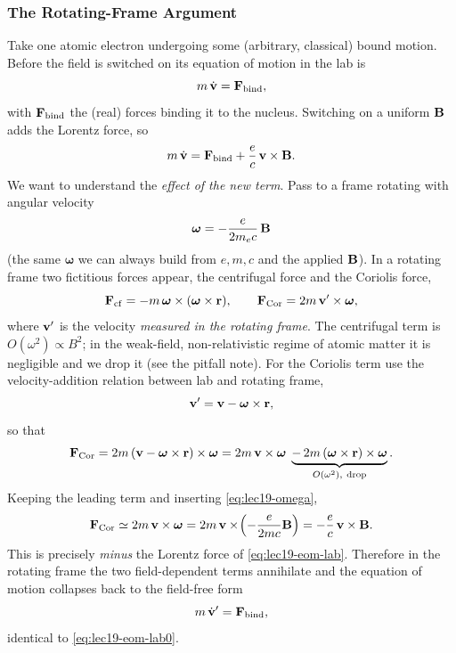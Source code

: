\subsubsection*{The Rotating-Frame Argument}
Take one atomic electron undergoing some (arbitrary, classical) bound motion. Before the
field is switched on its equation of motion in the lab is
\begin{equation}\label{eq:lec19-eom-lab0}
  m\,\dot{\mathbf{v}}=\mathbf{F}_{\rm bind},
\end{equation}
with $\mathbf{F}_{\rm bind}$ the (real) forces binding it to the nucleus. Switching on a
uniform $\mathbf{B}$ adds the Lorentz force, so
\begin{equation}\label{eq:lec19-eom-lab}
  m\,\dot{\mathbf{v}}=\mathbf{F}_{\rm bind}+\frac{e}{c}\,\mathbf{v}\times\mathbf{B} .
\end{equation}
We want to understand the \emph{effect of the new term}. Pass to a frame rotating with
angular velocity
\begin{equation}\label{eq:lec19-omega}
  \boldsymbol{\omega}=-\frac{e}{2m_ec}\,\mathbf{B}
\end{equation}
(the same $\boldsymbol{\omega}$ we can always build from $e,m,c$ and the applied $\mathbf{B}$).
In a rotating frame two fictitious forces appear, the centrifugal force and the Coriolis
force,
\begin{equation}\label{eq:lec19-coriolis}
  \mathbf{F}_{\rm cf}=-m\,\boldsymbol{\omega}\times(\boldsymbol{\omega}\times\mathbf{r}),
  \qquad
  \mathbf{F}_{\rm Cor}=2m\,\mathbf{v}'\times\boldsymbol{\omega},
\end{equation}
where $\mathbf{v}'$ is the velocity \emph{measured in the rotating frame}. The centrifugal
term is $O(\omega^2)\propto B^2$; in the weak-field, non-relativistic regime of atomic
matter it is negligible and we drop it (see the pitfall note). For the Coriolis term use
the velocity-addition relation between lab and rotating frame,
\begin{equation}\label{eq:lec19-vprime}
  \mathbf{v}'=\mathbf{v}-\boldsymbol{\omega}\times\mathbf{r},
\end{equation}
so that
\begin{equation}\label{eq:lec19-coriolis-expand}
  \bvec{F}_{\rm Cor}
  =2m\,(\bvec{v}-\boldsymbol{\omega}\times\br)\times\boldsymbol{\omega}
  =2m\,\bvec{v}\times\boldsymbol{\omega}
   \;\underbrace{-\,2m\,(\boldsymbol{\omega}\times\br)\times\boldsymbol{\omega}}_{O(\omega^2),\ \text{drop}} .
\end{equation}
Keeping the leading term and inserting \eqref{eq:lec19-omega},
\begin{equation}\label{eq:lec19-cancel}
  \mathbf{F}_{\rm Cor}\simeq 2m\,\mathbf{v}\times\boldsymbol{\omega}
  =2m\,\mathbf{v}\times\!\left(-\frac{e}{2m c}\mathbf{B}\right)
  =-\frac{e}{c}\,\mathbf{v}\times\mathbf{B} .
\end{equation}
This is precisely \emph{minus} the Lorentz force of \eqref{eq:lec19-eom-lab}. Therefore in
the rotating frame the two field-dependent terms annihilate and the equation of motion
collapses back to the field-free form
\begin{equation}\label{eq:lec19-eom-rot}
  m\,\dot{\mathbf{v}}'=\mathbf{F}_{\rm bind},
\end{equation}
identical to \eqref{eq:lec19-eom-lab0}.

